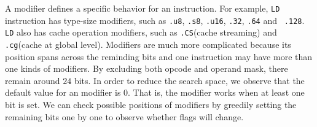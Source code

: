 A modifier defines a specific behavior for an instruction. For example,
{\tt LD} instruction has type-size modifiers, such as {\tt .u8}, {\tt .s8}, {\tt .u16}, {\tt .32}, {\tt .64} and {\tt 
.128}. {\tt LD} also has cache operation modifiers, such as {\tt .CS}(cache streaming) and {\tt .cg}(cache at global 
level). Modifiers are much more complicated because its position spans across the reminding bits and one instruction 
may have more than one kinds of modifiers. By excluding both opcode and operand mask, there remain around $24$ bits. In 
order to reduce the search space, we observe that the default value for an modifier is $0$. That is, the modifier works when at 
least one bit is set. We can check possible positions of modifiers by greedily setting the remaining bits one by one to 
observe whether flags will change.

